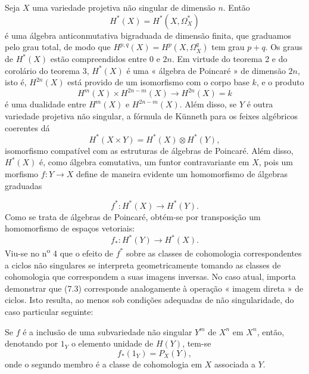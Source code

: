 
Seja $X$ uma variedade projetiva não singular de dimensão $n$. Então
\[
  H^{*}(X)=H^{*}(X,\Omega_X^{*})
\]
é uma álgebra anticonmutativa bigraduada de dimensão finita, que graduamos
pelo grau total, de modo que $H^{p,q}(X)=H^{p}(X,\Omega_X^{q})$ tem grau
$p+q$. Os graus de $H^{*}(X)$ estão compreendidos entre $0$ e $2n$. Em virtude do
teorema 2 e do corolário do teorema 3, $H^{*}(X)$ é uma « álgebra de
Poincaré » de dimensão $2n$, isto é, $H^{2n}(X)$ está provido de um isomorfismo com
o corpo base $k$, e o produto
\[
  H^{m}(X)\times H^{2n-m}(X)\longrightarrow H^{2n}(X)=k
\]
é uma dualidade entre $H^{m}(X)$ e $H^{2n-m}(X)$. Além disso, se $Y$ é outra
variedade projetiva não singular, a fórmula de Künneth para os
feixes algébricos coerentes dá
\begin{equation}\tag{7.1}
  H^{*}(X\times Y)=H^{*}(X)\otimes H^{*}(Y),
\end{equation}
isomorfismo compatível com as estruturas de álgebras de Poincaré. Além disso,
$H^{*}(X)$ é, como álgebra comutativa, um funtor contravariante em
$X$, pois um morfismo $f:Y\longrightarrow X$ define de maneira evidente um
homomorfismo de álgebras graduadas

\begin{equation}\tag{7.2}
  f^{*}:H^{*}(X)\longrightarrow H^{*}(Y).
\end{equation}
Como se trata de álgebras de Poincaré, obtém-se por transposição um
homomorfismo de espaços vetoriais:
\begin{equation}\tag{7.3}
  f_{*}:H^{*}(Y)\longrightarrow H^{*}(X).
\end{equation}
Viu-se no n\textsuperscript{o} 4 que o efeito de $f^{*}$ sobre as classes de
cohomologia correspondentes a ciclos não singulares se interpreta
geometricamente tomando as classes de cohomologia que correspondem a suas
imagens inversas. No caso atual, importa demonstrar que (7.3) corresponde
analogamente à operação « imagem direta » de ciclos. Isto resulta, ao menos sob
condições adequadas de não singularidade, do caso particular seguinte:

 Se $f$ é a inclusão de uma subvariedade não
singular $Y^{m}$ de $X^{n}$ em $X^{n}$, então, denotando por $1_Y$
o elemento unidade de $H(Y)$, tem-se
\begin{equation}\tag{7.4}
  f_{*}(1_Y)=P_X(Y),
\end{equation}
onde o segundo membro é a classe de cohomologia em $X$ associada a $Y$.

